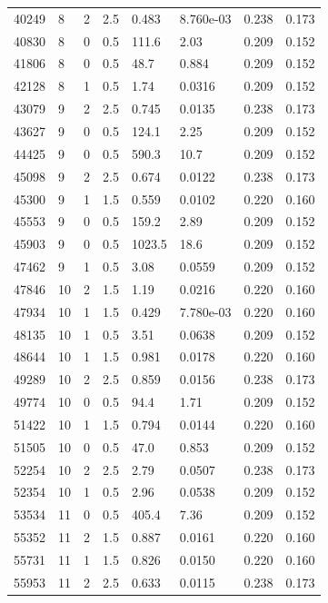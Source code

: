 \documentclass[preview]{standalone}
\begin{document}
{{{\begin{tabular}{L{1.2cm}C{1.2cm} C{0.3cm}C{0.5cm} C{1.4cm}C{1.4cm} C{1.4cm}C{1.4cm}}
  40249  &     8  & 2     & 2.5 &  0.483  & 8.760e-03  & 0.238 &  0.173   \\ 
  40830  &     8  & 0     & 0.5 &  111.6  & 2.03  & 0.209 &  0.152   \\ 
  41806  &     8  & 0     & 0.5 &  48.7  & 0.884  & 0.209 &  0.152   \\ 
  42128  &     8  & 1     & 0.5 &  1.74  & 0.0316  & 0.209 &  0.152   \\ 
  43079  &     9  & 2     & 2.5 &  0.745  & 0.0135  & 0.238 &  0.173   \\ 
  43627  &     9  & 0     & 0.5 &  124.1  & 2.25  & 0.209 &  0.152   \\ 
  44425  &     9  & 0     & 0.5 &  590.3  & 10.7  & 0.209 &  0.152   \\ 
  45098  &     9  & 2     & 2.5 &  0.674  & 0.0122  & 0.238 &  0.173   \\ 
  45300  &     9  & 1     & 1.5 &  0.559  & 0.0102  & 0.220 &  0.160   \\ 
  45553  &     9  & 0     & 0.5 &  159.2  & 2.89  & 0.209 &  0.152   \\ 
  45903  &     9  & 0     & 0.5 &  1023.5  & 18.6  & 0.209 &  0.152   \\ 
  47462  &     9  & 1     & 0.5 &  3.08  & 0.0559  & 0.209 &  0.152   \\ 
  47846  &    10  & 2     & 1.5 &  1.19  & 0.0216  & 0.220 &  0.160   \\ 
  47934  &    10  & 1     & 1.5 &  0.429  & 7.780e-03  & 0.220 &  0.160   \\ 
  48135  &    10  & 1     & 0.5 &  3.51  & 0.0638  & 0.209 &  0.152   \\ 
  48644  &    10  & 1     & 1.5 &  0.981  & 0.0178  & 0.220 &  0.160   \\ 
  49289  &    10  & 2     & 2.5 &  0.859  & 0.0156  & 0.238 &  0.173   \\ 
  49774  &    10  & 0     & 0.5 &  94.4  & 1.71  & 0.209 &  0.152   \\ 
  51422  &    10  & 1     & 1.5 &  0.794  & 0.0144  & 0.220 &  0.160   \\ 
  51505  &    10  & 0     & 0.5 &  47.0  & 0.853  & 0.209 &  0.152   \\ 
  52254  &    10  & 2     & 2.5 &  2.79  & 0.0507  & 0.238 &  0.173   \\ 
  52354  &    10  & 1     & 0.5 &  2.96  & 0.0538  & 0.209 &  0.152   \\ 
  53534  &    11  & 0     & 0.5 &  405.4  & 7.36  & 0.209 &  0.152   \\ 
  55352  &    11  & 2     & 1.5 &  0.887  & 0.0161  & 0.220 &  0.160   \\ 
  55731  &    11  & 1     & 1.5 &  0.826  & 0.0150  & 0.220 &  0.160   \\ 
  55953  &    11  & 2     & 2.5 &  0.633  & 0.0115  & 0.238 &  0.173   \\ 
\hline 
\end{tabular} 

}}}
\end{document}
